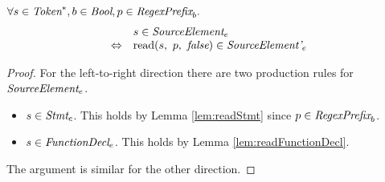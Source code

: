 \documentclass[preprint,10pt]{sigplanconf}
\begin{document}
\begin{lemma}\mbox{}
  
  \( \forall s \in \textit{Token}^*, b \in \textit{Bool}, p \in \textit{RegexPrefix}_b. \)
  \[
  \begin{array}{rl}
  &s \in \textit{SourceElement}_{e} 
  \\
  \Leftrightarrow &
  \textrm{read}(s,~p,~\textit{false}) \in \textit{SourceElement'}_{e}
  \end{array}
  \]
\end{lemma}
\begin{proof}
  For the left-to-right direction there are two production rules for 
  \( \textit{SourceElement}_{e} \).
  \begin{itemize}
  \item \( s \in \textit{Stmt}_{e} \).
    This holds by Lemma \ref{lem:readStmt} since \( p \in \textit{RegexPrefix}_b \).
    
  \item \( s \in \textit{FunctionDecl}_{e} \). This holds by Lemma
    \ref{lem:readFunctionDecl}.
  \end{itemize}

  The argument is similar for the other direction.
\end{proof}
\end{document}
